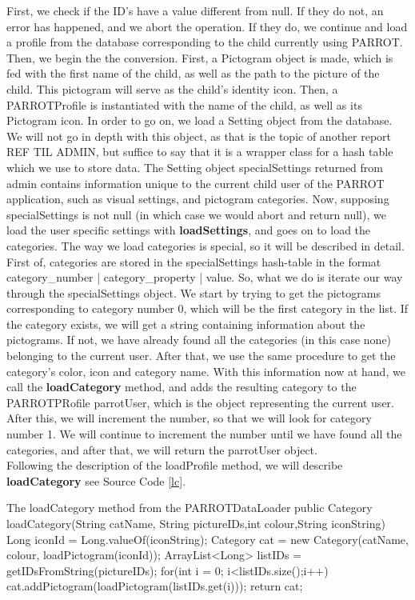 First, we check if the ID's have a value different from null. If they do not, an error has happened, and we abort the operation.
If they do, we continue and load a profile from the database corresponding to the child currently using PARROT.
Then, we begin the the conversion.
First, a Pictogram object is made, which is fed with the first name of the child, as well as the path to the picture of the child.
This pictogram will serve as the child's identity icon.
Then, a PARROTProfile is instantiated with the name of the child, as well as its Pictogram icon.
In order to go on, we load a Setting object from the database. We will not go in depth with this object, as that is the topic of another report REF TIL ADMIN, but suffice to say that it is a wrapper class for a hash table %
which we use to store data.
The Setting object specialSettings returned from admin contains information unique to the current child user of the PARROT application, such as visual settings, and pictogram categories.
Now, supposing specialSettings is not null (in which case we would abort and return null), we load the user specific settings with \textbf{loadSettings}, and goes on to load the categories.
The way we load categories is special, so it will be described in detail.
First of, categories are stored in the specialSettings hash-table in the format category\_number | category\_property | value.
So, what we do is iterate our way through the specialSettings object.
We start by trying to get the pictograms corresponding to category number 0, which will be the first category in the list.
If the category exists, we will get a string containing information about the pictograms.
If not, we have already found all the categories (in this case none) belonging to the current user.
After that, we use the same procedure to get the category's color, icon and category name.
With this information now at hand, we call the \textbf{loadCategory} method, and adds the resulting category to the PARROTPRofile parrotUser, which is the object representing the current user.
After this, we will increment the number, so that we will look for category number 1.
We will continue to increment the number until we have found all the categories, and after that, we will return the parrotUser object.\newline
\\
Following the description of the loadProfile method, we will describe \textbf{loadCategory} see Source Code \ref{lc}.

\begin{source}[{lc}]{The loadCategory method from the PARROTDataLoader}
	public Category loadCategory(String catName, String pictureIDs,int colour,String iconString)
	{
		Long iconId = Long.valueOf(iconString);
		Category cat = new Category(catName, colour, loadPictogram(iconId));
		ArrayList<Long> listIDs = getIDsFromString(pictureIDs);
		for(int i = 0; i<listIDs.size();i++)
		{
			cat.addPictogram(loadPictogram(listIDs.get(i)));
		}
		return cat;
	}
\end{source}

